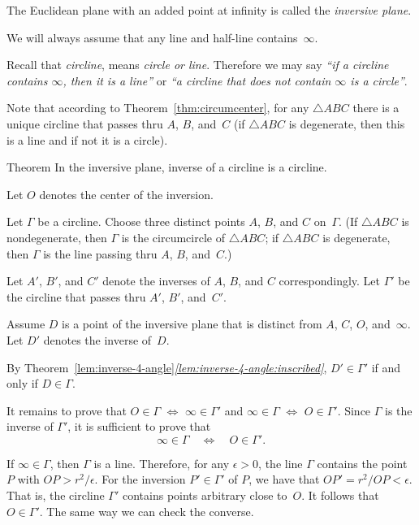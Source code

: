 The Euclidean plane with an added point at infinity is called the \emph{inversive plane}.

We will always assume that any line and half-line contains~$\infty$. 

Recall that
\emph{circline},
means {}\emph{circle or line}.
Therefore we may say 
{}\emph{``if a circline contains $\infty$, then it is a line''} or {}\emph{``a circline that does not contain $\infty$  is a circle''}.

Note that according to Theorem~\ref{thm:circumcenter}, 
for any $\triangle ABC$ there is a unique circline that passes thru $A$, $B$, and~$C$
(if $\triangle ABC$ is degenerate, then this is a line and if not it is a circle).

\begin{thm}{Theorem}\label{thm:inverse-cline}
In the inversive plane, inverse of a circline is a circline.
\end{thm}

Let $O$ denotes the center of the inversion.

Let $\Gamma$ be a circline.
Choose three distinct points $A$, $B$, and $C$ on~$\Gamma$.
(If $\triangle ABC$ is nondegenerate, 
then $\Gamma$ is the circumcircle of $\triangle ABC$;
if $\triangle ABC$ is degenerate, 
then $\Gamma$ is the line passing thru $A$, $B$, and~$C$.)

Let $A'$, $B'$, and $C'$ denote the inverses of $A$, $B$, and $C$ correspondingly.
Let $\Gamma'$ be the circline that passes thru $A'$, $B'$, and~$C'$.

Assume $D$ is a point of the inversive plane that is distinct from $A$, $C$, $O$, and~$\infty$.
Let $D'$ denotes the inverse of~$D$.

By Theorem~\ref{lem:inverse-4-angle}\textit{\ref{lem:inverse-4-angle:inscribed}},
$D'\in\Gamma'$ if and only if $D\in\Gamma$.

It remains to prove that 
$O\in \Gamma$ $\Leftrightarrow$ $\infty\in\Gamma'$ 
and 
$\infty\in \Gamma$ $\Leftrightarrow$ $O\in\Gamma'$.
Since $\Gamma$ is the inverse of $\Gamma'$, it is sufficient to prove that 
$$\infty\in \Gamma
\quad
\iff
\quad
O\in\Gamma'.$$

If $\infty\in\Gamma$, then $\Gamma$ is a line.
Therefore, for any $\epsilon>0$, the line $\Gamma$ contains the point $P$ with  $OP>r^2/\epsilon$.
For the inversion $P'\in\Gamma'$ of $P$, we have that $OP'=r^2/OP<\epsilon$.
That is, the circline $\Gamma'$ contains points arbitrary close to~$O$.
It follows that $O\in \Gamma'$.
The same way we can check the converse. 
\qeds



